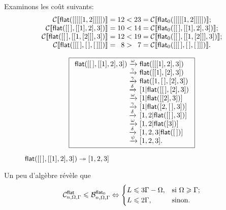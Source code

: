 Examinons les coût suivants:
\begin{equation*}
\begin{array}{@{}r@{\;}c@{\;}r@{\;}c@{\;}r@{\;}c@{\;}l@{}}
\Call{\fun{flat}([[[[[1,2]]]]])}
  &=& 12 &<& 23 &=& \Call{\fun{flat\(_0\)}([[[[[1,2]]]]])};\\
\Call{\fun{flat}([\el,[[1],2],3])}
  &=& 10 &<& 14 &=& \Call{\fun{flat\(_0\)}([\el,[[1],2],3])};\\
\Call{\fun{flat}([\el,[[1,[2]]],3])}
  &=& 12 &<& 19 &=& \Call{\fun{flat\(_0\)}([\el,[[1,[2]]],3])};\\
\Call{\fun{flat}([[\el,\el,\el]])}
  &=&  8 &>&  7 &=& \Call{\fun{flat\(_0\)}([[\el,\el,\el]])}.
\end{array}
\end{equation*}
\begin{figure}
\begin{equation*}
\boxed{%
\begin{array}{r@{\;}l@{\;}l}
\fun{flat}([\el,[[1],2],3])
& \xrightarrow{\smash{\omega}} & \fun{flat}([[[1],2],3])\\
& \xrightarrow{\smash{\gamma}} & \fun{flat}([[1],[2],3])\\
& \xrightarrow{\smash{\gamma}} & \fun{flat}([1,\el,[2],3])\\
& \xrightarrow{\smash{\delta}} & [1|\fun{flat}([\el,[2],3])\\
& \xrightarrow{\smash{\omega}} & [1|\fun{flat}([[2],3])]\\
& \xrightarrow{\smash{\gamma}} & [1|\fun{flat}([2,\el,3])]\\
& \xrightarrow{\smash{\delta}} & [1,2|\fun{flat}([\el,3])]\\
& \xrightarrow{\smash{\omega}} & [1,2|\fun{flat}([3])]\\
& \xrightarrow{\smash{\delta}} & [1,2,3|\fun{flat}(\el)]\\
& \xrightarrow{\smash{\psi}}   & [1,2,3].
\end{array}}
\end{equation*}
\caption{\(\fun{flat}([\el,[[1],2],3]) \twoheadrightarrow [1,2,3]\)
\label{fig_flat_ex}
}
\end{figure}
Un peu d'algèbre révèle que
\begin{equation*}
\C{\fun{flat}}{n,\Omega,\Gamma}
\leqslant 
\B{\fun{flat}_0}{n,\Omega,\Gamma} 
\Leftrightarrow 
\begin{cases}
  L \leqslant 3\Gamma - \Omega,
                         & \text{si \(\Omega \geqslant \Gamma\)};\\
  L \leqslant 2\Gamma,   & \text{sinon.}
\end{cases}
\end{equation*}
